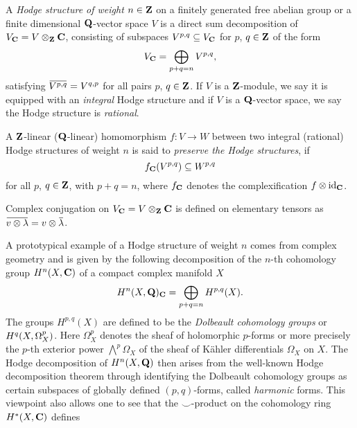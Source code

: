 \begin{definition}
    A \emph{Hodge structure of weight $n \in \mathbf Z$} on a finitely generated free abelian group or a finite dimensional $\mathbf Q$-vector space $V$ is a direct sum decomposition of $V_\mathbf C = V \otimes_\mathbf Z \mathbf C$, consisting of subspaces $V^{p,q} \subseteq V_\mathbf C$ for $p$, $q \in \mathbf Z$ of the form
    \[  
        V_\mathbf C = \bigoplus_{p+q = n} V^{p,q},
    \]
    satisfying $\ols{V^{p,q}} = V^{q,p}$ for all pairs $p$, $q \in \mathbf Z$. If $V$ is a $\mathbf Z$-module, we say it is equipped with an \emph{integral} Hodge structure and if $V$ is a $\mathbf Q$-vector space, we say the Hodge structure is \emph{rational}.
    
    A $\mathbf Z$-linear (\resp $\mathbf Q$-linear) homomorphism $f \colon V \to W$ between two integral (\resp rational) Hodge structures of weight $n$ is said to \emph{preserve the Hodge structures}, if
    \[
        f_\mathbf C(V^{p,q}) \subseteq W^{p,q}
    \]  
    for all $p$, $q \in \mathbf Z$, with $p + q = n$, where $f_\mathbf C$ denotes the complexification $f \otimes \operatorname{id}_{\mathbf C}$.
\end{definition}

\begin{remark}
    Complex conjugation on $V_\mathbf C = V \otimes_\mathbf Z \mathbf C$ is defined on elementary tensors as $\ols{v \otimes \lambda} = v \otimes \ols{\lambda}$.
\end{remark}

A prototypical example of a Hodge structure of weight $n$ comes from complex geometry and is given by the following decomposition of the $n$-th cohomology group $H^{n}(X, \mathbf C)$ of a compact complex manifold $X$
\[
    H^n(X, \mathbf Q)_\mathbf C = \bigoplus_{p+q = n} H^{p,q}(X).
\]
The groups $H^{p,q}(X)$ are defined to be the \emph{Dolbeault cohomology groups} or $H^{q}(X, \Omega_X^p)$. Here $\Omega_X^p$ denotes the sheaf of holomorphic $p$-forms or more precisely the $p$-th exterior power $\bigwedge^p \Omega_X$ of the sheaf of Kähler differentials $\Omega_X$ on $X$. The Hodge decomposition of $H^{n}(X, \mathbf Q)$ then arises from the well-known Hodge decomposition theorem through identifying the Dolbeault cohomology groups as certain subspaces of globally defined $(p,q)$-forms, called \emph{harmonic} forms. This viewpoint also allows one to see that the $\smallsmile$-product on the cohomology ring $H^{*}(X, \mathbf C)$ defines  



